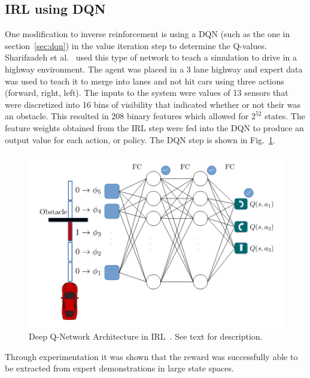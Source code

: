 \documentclass[12pt,american]{report}
\begin{document}
\subsection{IRL using DQN}
One modification to inverse reinforcement is using a DQN (such as the one in section~\ref{sec:dqn}) in the value iteration step to determine the Q-values. Sharifzadeh et al.~\cite{sharifzadeh2016learning} used this type of network to teach a simulation to drive in a highway environment. The agent was placed in a 3 lane highway and expert data was used to teach it to merge into lanes and not hit cars using three actions (forward, right, left).  The inputs to the system were values of 13 sensors that were discretized into 16 bins of visibility that indicated whether or not their was an obstacle. This resulted in 208 binary features which allowed for $2^{52}$ states. The feature weights obtained from the IRL step were fed into the DQN to produce an output value for each action, or policy. The DQN step is shown in Fig.~\ref{fig:irl-dqn}.
\begin{figure}
\centering
\includegraphics[scale=1.5]{images/irl-dqn.png}
\caption{Deep Q-Network Architecture in IRL~\cite{sharifzadeh2016learning}. See text for description.}
\label{fig:irl-dqn}
\end{figure}
Through experimentation it was shown that the reward was successfully able to be extracted from expert demonstrations in large state spaces.
\end{document}
